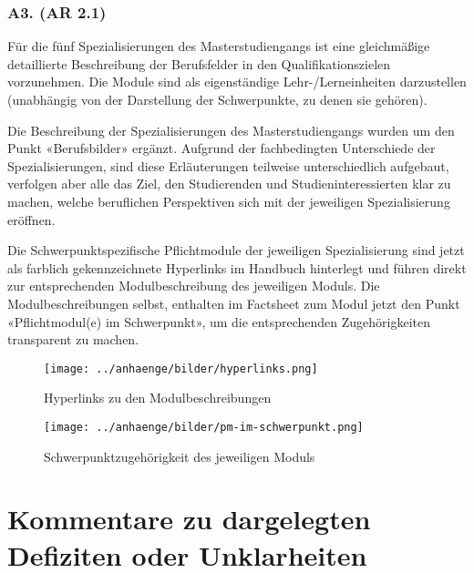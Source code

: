 \subsection{A3. (AR 2.1)
\label{/mi-2017/selbstbericht/auflagen/0000-auflagen}}\label{a3.-ar-2.1-pathlabelmi-2017selbstberichtauflagen0000-auflagen}

\begin{siderules}
Für die fünf Spezialisierungen des Masterstudiengangs ist eine
gleichmäßige detaillierte Beschreibung der Berufsfelder in den
Qualifikationszielen vorzunehmen. Die Module sind als eigenständige
Lehr-/Lerneinheiten darzustellen (unabhängig von der Darstellung der
Schwerpunkte, zu denen sie gehören).
\end{siderules}

Die Beschreibung der Spezialisierungen des Masterstudiengangs wurden um
den Punkt «Berufsbilder» ergänzt. Aufgrund der fachbedingten
Unterschiede der Spezialisierungen, sind diese Erläuterungen teilweise
unterschiedlich aufgebaut, verfolgen aber alle das Ziel, den
Studierenden und Studieninteressierten klar zu machen, welche
beruflichen Perspektiven sich mit der jeweiligen Spezialisierung
eröffnen.

Die Schwerpunktspezifische Pflichtmodule der jeweiligen Spezialisierung
sind jetzt als farblich gekennzeichnete Hyperlinks im Handbuch
hinterlegt und führen direkt zur entsprechenden Modulbeschreibung des
jeweiligen Moduls. Die Modulbeschreibungen selbst, enthalten im
Factsheet zum Modul jetzt den Punkt «Pflichtmodul(e) im Schwerpunkt», um
die entsprechenden Zugehörigkeiten transparent zu machen.

\begin{figure}[htbp]
\centering
\texttt{[image: ../anhaenge/bilder/hyperlinks.png]}
\caption{Hyperlinks zu den Modulbeschreibungen}
\end{figure}

\begin{figure}[htbp]
\centering
\texttt{[image: ../anhaenge/bilder/pm-im-schwerpunkt.png]}
\caption{Schwerpunktzugehörigkeit des jeweiligen Moduls}
\end{figure}

\chapter{Kommentare zu dargelegten Defiziten oder
Unklarheiten\label{/mi-2017/selbstbericht/stellungnahme/0000-stellungnahme}}\label{kommentare-zu-dargelegten-defiziten-oder-unklarheitenpathlabelmi-2017selbstberichtstellungnahme0000-stellungnahme}

